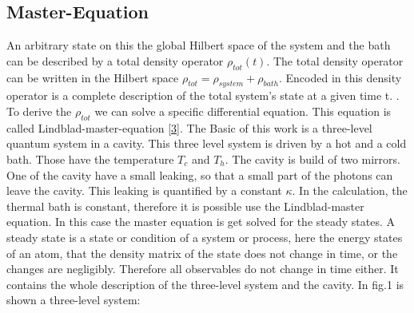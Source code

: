 \documentclass[12pt,a4paper]{article}
\begin{document}
\subsection{Master-Equation} 
An arbitrary state on this the global Hilbert space of the system and the bath can be described by a total density operator $\rho_{tot}(t)$. The total density operator can be written in the Hilbert space $ \rho_ {tot}= \rho_{system}+\rho_{bath}$.  Encoded in this density 
operator is a complete description of the total system's state at a given time t. \cite{Li2017}. To derive the $\rho_{tot}$ we can solve a specific differential equation. This equation is called Lindblad-master-equation \eqref{3}. 
The Basic of this work is a three-level quantum system in a cavity. This three level system is driven by a hot and a cold bath. Those have the temperature $T_c$ and $T_h$. The cavity is build of two mirrors. One of the cavity have a small leaking, so that a small part of the photons can leave the cavity. This leaking is quantified by a constant $\kappa$.
In the calculation, the thermal bath is constant, therefore 
it is possible use the Lindblad-master equation. 
In this case the master equation is get solved for the steady states.
A steady state is a state or condition of a system or process, here the energy states of an atom, that the density matrix of the state does not change in time, or the changes are negligibly. Therefore all observables do not change in time either. 
It contains the whole description of the three-level system and the cavity.
In fig.1 is shown a three-level system:
\newpage
\end{document}
